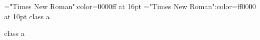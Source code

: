 \font\ba="Times New Roman":color=0000ff at 16pt
\font\a="Times New Roman":color=ff0000 at 10pt
\a class a 

\ba 

\a class a 


\bye
